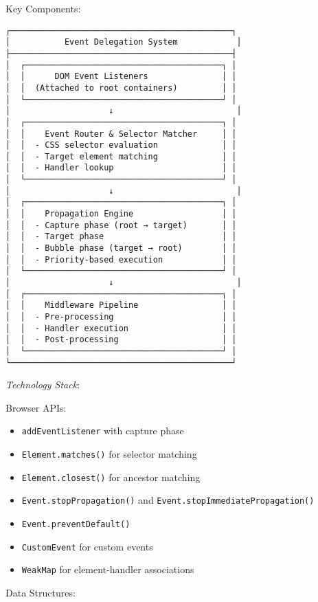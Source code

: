 \documentclass[11pt]{article}
\begin{document}
Key Components:

\begin{verbatim}
┌─────────────────────────────────────────────┐
│           Event Delegation System            │
├─────────────────────────────────────────────┤
│  ┌────────────────────────────────────────┐ │
│  │      DOM Event Listeners               │ │
│  │  (Attached to root containers)         │ │
│  └────────────────────────────────────────┘ │
│                    ↓                         │
│  ┌────────────────────────────────────────┐ │
│  │    Event Router & Selector Matcher     │ │
│  │  - CSS selector evaluation             │ │
│  │  - Target element matching             │ │
│  │  - Handler lookup                      │ │
│  └────────────────────────────────────────┘ │
│                    ↓                         │
│  ┌────────────────────────────────────────┐ │
│  │    Propagation Engine                  │ │
│  │  - Capture phase (root → target)       │ │
│  │  - Target phase                        │ │
│  │  - Bubble phase (target → root)        │ │
│  │  - Priority-based execution            │ │
│  └────────────────────────────────────────┘ │
│                    ↓                         │
│  ┌────────────────────────────────────────┐ │
│  │    Middleware Pipeline                 │ │
│  │  - Pre-processing                      │ │
│  │  - Handler execution                   │ │
│  │  - Post-processing                     │ │
│  └────────────────────────────────────────┘ │
└─────────────────────────────────────────────┘
\end{verbatim}

\emph{Technology Stack}:

Browser APIs:

\begin{itemize}
\item \texttt{addEventListener} with capture phase
\item \texttt{Element.matches()} for selector matching
\item \texttt{Element.closest()} for ancestor matching
\item \texttt{Event.stopPropagation()} and \texttt{Event.stopImmediatePropagation()}
\item \texttt{Event.preventDefault()}
\item \texttt{CustomEvent} for custom events
\item \texttt{WeakMap} for element-handler associations
\end{itemize}

Data Structures:
\end{document}
